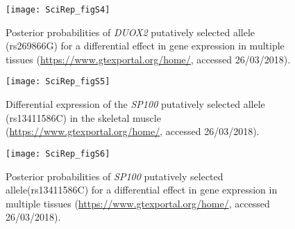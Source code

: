 \begin{figure}[hp]
    \centering
    \texttt{[image: SciRep\_figS4]}
    \caption[Posterior probabilities of \textsl{DUOX2} putatively selected allele.]{Posterior probabilities of \textsl{DUOX2} putatively selected allele (rs269866G) for a differential effect in gene expression in multiple tissues (\url{https://www.gtexportal.org/home/}, accessed 26/03/2018).}
    \label{fig:SciRep_figS4}
\end{figure}

\begin{figure}[hp]
    \centering
    \texttt{[image: SciRep\_figS5]}
    \caption[Differential expression of the \textsl{SP100} putatively selected allele.]{Differential expression of the \textsl{SP100} putatively selected allele (rs13411586C) in the skeletal muscle (\url{https://www.gtexportal.org/home/}, accessed 26/03/2018).}
    \label{fig:SciRep_figS5}
\end{figure}
    
\begin{figure}[hp]
    \centering
    \texttt{[image: SciRep\_figS6]}
    \caption[Posterior probabilities of \textsl{SP100} putatively selected allele.]{Posterior probabilities of \textsl{SP100} putatively selected allele(rs13411586C) for a differential effect in gene expression in multiple tissues (\url{https://www.gtexportal.org/home/}, accessed 26/03/2018).}
    \label{fig:SciRep_figS6}
\end{figure}

